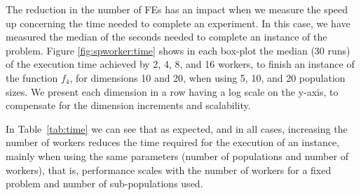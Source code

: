 \documentclass[review]{elsarticle}
\begin{document}
The reduction in the number of FEs has an impact when we measure the speed up
concerning the time needed to complete an experiment. In this case, we have
measured the median of the seconds needed to complete an instance of the
problem. Figure \ref{fig:spworker:time} shows in each box-plot the median (30
runs) of the execution time achieved by 2, 4, 8, and 16 workers, to finish an
instance of the function $f_4$, for dimensions 10 and 20, when using 5, 10, and
20 population sizes. We present each dimension in a row having a log scale on
the y-axis, to compensate for the dimension increments and scalability.  
 

In Table~\ref{tab:time} we can see that as expected, and in all cases, 
increasing the number of workers reduces the time required for the execution of an instance, 
mainly when using the same parameters (number of populations and number of workers), that is, performance
scales with the number of workers for a fixed problem and number of
sub-populations used. 




\end{document}
